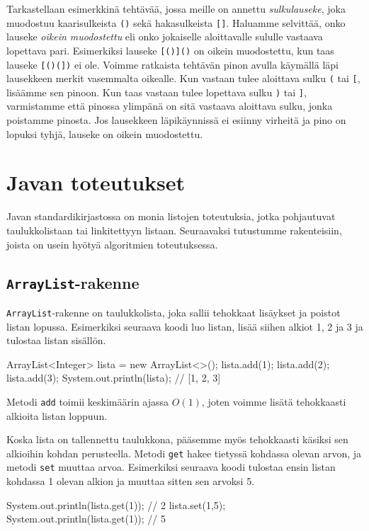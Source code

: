 Tarkastellaan esimerkkinä tehtävää, jossa meille on annettu
\emph{sulkulauseke}, joka muodostuu kaarisulkeista \texttt{()} sekä
hakasulkeista \texttt{[]}.
Haluamme selvittää, onko lauseke \emph{oikein muodostettu} eli
onko jokaiselle aloittavalle sululle vastaava lopettava pari.
Esimerkiksi lauseke \texttt{[()]()} on oikein muodostettu,
kun taas lauseke \texttt{[()(])} ei ole.
Voimme ratkaista tehtävän pinon avulla
käymällä läpi lausekkeen merkit vasemmalta oikealle.
Kun vastaan tulee aloittava sulku \texttt{(} tai \texttt{[},
lisäämme sen pinoon.
Kun taas vastaan tulee lopettava sulku \texttt{)} tai
\texttt{]}, varmistamme että pinossa ylimpänä on sitä vastaava
aloittava sulku, jonka poistamme pinosta.
Jos lausekkeen läpikäynnissä ei esiinny virheitä ja pino on lopuksi tyhjä,
lauseke on oikein muodostettu.

\section{Javan toteutukset}

Javan standardikirjastossa on monia listojen toteutuksia,
jotka pohjautuvat taulukkolistaan tai linkitettyyn listaan.
Seuraavaksi tutustumme rakenteisiin, joista on usein
hyötyä algoritmien toteutuksessa.

\subsection{\texttt{ArrayList}-rakenne}

\texttt{ArrayList}-rakenne on taulukkolista,
joka sallii tehokkaat lisäykset ja poistot listan lopussa.
Esimerkiksi seuraava koodi luo listan, lisää siihen alkiot
1, 2 ja 3 ja tulostaa listan sisällön.

\begin{code}
ArrayList<Integer> lista = new ArrayList<>();
lista.add(1);
lista.add(2);
lista.add(3);
System.out.println(lista); // [1, 2, 3]
\end{code}

Metodi \texttt{add} toimii keskimäärin ajassa $O(1)$,
joten voimme lisätä tehokkaasti alkioita listan loppuun.

Koska lista on tallennettu taulukkona,
pääsemme myös tehokkaasti käsiksi sen alkioihin
kohdan perusteella.
Metodi \texttt{get} hakee tietyssä kohdassa olevan arvon,
ja metodi \texttt{set} muuttaa arvoa.
Esimerkiksi seuraava koodi tulostaa ensin
listan kohdassa 1 olevan alkion ja muuttaa sitten
sen arvoksi 5.

\begin{code}
System.out.println(lista.get(1)); // 2
lista.set(1,5);
System.out.println(lista.get(1)); // 5
\end{code}

